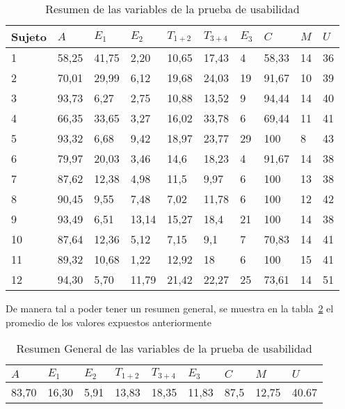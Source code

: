 \begin{table}[H]
\centering
\footnotesize
\begin{tabular}{|p{1.2cm}|p{1.2cm}|p{1.2cm}|p{1.2cm}|p{1.2cm}|p{1.2cm}|p{1.2cm}|p{1.2cm}|p{1.2cm}|p{1.2cm}|}
\hline
Sujeto  &   $A$  &   $E_1$ &  $E_2$  &  $T_{1+2}$  & $T_{3+4}$     & $E_3$ & $C$ &  $M$ & $U$ \\
\hline 
1 &  58,25 & 41,75 & 2,20  & 10,65 & 17,43 & 4  & 58,33 & 14 & 36 \\
2 &  70,01 & 29,99 & 6,12  & 19,68 & 24,03 & 19 & 91,67 & 10 & 39 \\
3 &  93,73 & 6,27  & 2,75  & 10,88 & 13,52 & 9  & 94,44 & 14 & 40 \\
4 &  66,35 & 33,65 & 3,27  & 16,02 & 33,78 & 6  & 69,44 & 11 & 41 \\
5 &  93,32 & 6,68  & 9,42  & 18,97 & 23,77 & 29 & 100     & 8  & 43 \\
6 &  79,97 & 20,03 & 3,46  & 14,6  & 18,23 & 4  & 91,67 & 14 & 38 \\
7 &  87,62 & 12,38 & 4,98  & 11,5  & 9,97  & 6  & 100     & 13 & 38 \\
8 &  90,45 & 9,55  & 7,48  & 7,02  & 11,78 & 6  & 100     & 12 & 42 \\
9 &  93,49 & 6,51  & 13,14 & 15,27 & 18,4  & 21 & 100     & 14 & 38 \\
10 & 87,64 & 12,36 & 5,12  & 7,15  & 9,1   & 7  & 70,83 & 14 & 41 \\
11 & 89,32 & 10,68 & 1,22  & 12,92 & 18      & 6  & 100     & 15 & 41 \\
12 & 94,30 & 5,70  & 11,79 & 21,42 & 22,27 & 25 & 73,61 & 14 & 51 \\
\hline
\end{tabular}
\caption{Resumen de las variables de la prueba de usabilidad}
\label{sec:tabla-resumen-prueba}
\end{table}

De manera tal a poder tener un resumen general, se muestra en la tabla~\ref{sec:tabla-resumen-promedio} el promedio
de los valores expuestos anteriormente

\begin{table}[H]
\centering
\footnotesize
\begin{tabular}{|p{1.2cm}|p{1.2cm}|p{1.2cm}|p{1.2cm}|p{1.2cm}|p{1.2cm}|p{1.2cm}|p{1.2cm}|p{1.2cm}|}
\hline
$A$  &   $E_1$ &  $E_2$  &  $T_{1+2}$  & $T_{3+4}$     & $E_3$ & $C$ &  $M$ & $U$ \\
\hline 
83,70 & 16,30 & 5,91 & 13,83  & 18,35  & 11,83 & 87,5  & 12,75  & 40.67 \\
\hline
\end{tabular}
\caption{Resumen General de las variables de la prueba de usabilidad}
\label{sec:tabla-resumen-promedio}
\end{table}

